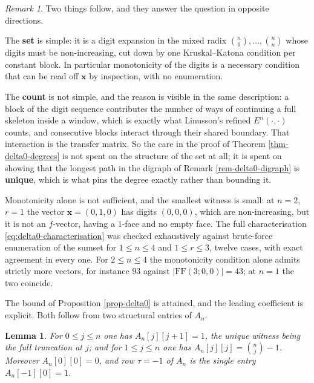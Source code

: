 \documentclass[11pt, a4paper, abstract=yes]{scrartcl}
\theoremstyle{definition}
\theoremstyle{remark}
\newtheorem{remark}[definition]{Remark}
\theoremstyle{plain}
\newtheorem{lemma}[definition]{Lemma}
\newcommand{\vek}[1]{\boldsymbol{#1}}
\begin{document}
\begin{remark}
Two things follow, and they answer the question in opposite directions.

The \textbf{set} is simple: it is a digit expansion in the mixed radix \(\binom n0,\dots,\binom nn\) whose
digits must be non-increasing, cut down by one Kruskal--Katona condition per constant block. In
particular monotonicity of the digits is a necessary condition that can be read off \(\vek x\) by
inspection, with no enumeration.

The \textbf{count} is not simple, and the reason is visible in the same description: a block of the digit
sequence contributes the number of ways of continuing a full skeleton inside a window, which is
exactly what Linusson's refined \(E^n(\cdot,\cdot)\) counts, and consecutive blocks interact through
their shared boundary. That interaction is the transfer matrix. So the care in the proof of
Theorem \ref{thm-delta0-degrees} is not spent on the structure of the set at all; it is spent on showing
that the longest path in the digraph of Remark \ref{rem-delta0-digraph} is \textbf{unique}, which is what pins
the degree exactly rather than bounding it.

Monotonicity alone is not sufficient, and the smallest witness is small: at \(n=2\), \(r=1\) the
vector \(\vek x=(0,1,0)\) has digits \((0,0,0)\), which are non-increasing, but it is not an
\(f\)-vector, having a \(1\)-face and no empty face. The full characterisation
\eqref{eq:delta0-characterisation} was checked exhaustively against brute-force enumeration of the
sumset for \(1\le n\le4\) and \(1\le r\le3\), twelve cases, with exact agreement in every one. For
\(2\le n\le4\) the monotonicity condition alone admits strictly more vectors, for instance \(93\)
against \(\lvert\mathrm{FF}(3;0,0)\rvert=43\); at \(n=1\) the two coincide.
\label{rem-delta0-structure}
\end{remark}

The bound of Proposition \ref{prop-delta0} is attained, and the leading coefficient is explicit. Both
follow from two structural entries of \(A_n\).

\begin{lemma}
For \(0\le j\le n\) one has \(A_n[j][j+1]=1\), the unique witness being the full truncation at \(j\);
and for \(1\le j\le n\) one has \(A_n[j][j]=\binom nj-1\). Moreover \(A_n[0][0]=0\), and row \(\tau=-1\)
of \(A_n\) is the single entry \(A_n[-1][0]=1\).
\label{lem-A-structure}
\end{lemma}
\end{document}
